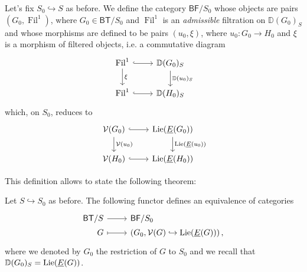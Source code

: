 \begin{defn}[]
	Let's fix $S_0 \hookrightarrow S$ as before.
	We define the category $\mathsf{BF}/S_0$ whose objects
	are pairs $(G_0, \operatorname{Fil}^1)$, where $G_0 \in \mathsf{BT}/S_0$
	and $\operatorname{Fil}^1$ is an \emph{admissible} filtration on
	$\mathbb{D}(G_0)_S$ and whose morphisms are defined to be
	pairs $(u_0, \xi)$, where $u_0\colon G_0 \to H_0$
	and $\xi$ is a morphism of filtered objects, i.e$.$ a commutative diagram
	\begin{equation*}
	\begin{tikzcd}
		\operatorname{Fil}^1 \arrow[d, "\xi", rightarrow] 
		\arrow[r, "", hookrightarrow] &
		\mathbb{D}(G_0)_S 
		\arrow[d, "\mathbb{D}(u_0)_S", rightarrow] \\
		\operatorname{Fil}^1 \arrow[r, "", hookrightarrow] &
		\mathbb{D}(H_0)_S
	\end{tikzcd}
	\end{equation*}
	which, on $S_0$, reduces to
	\begin{equation*}
	\begin{tikzcd}
		\mathcal{V}(G_0) \arrow[r, "", hookrightarrow] 
		\arrow[d, "\mathcal{V}(u_0)", rightarrow] &
		\lie(\underline{E}(G_0))
		\arrow[d, "\lie(\underline{E}(u_0))", rightarrow] \\
		\mathcal{V}(H_0) \arrow[r, "", hookrightarrow] &
		\lie(\underline{E}(H_0))
	\end{tikzcd}
	\end{equation*}
\end{defn}


\noindent
This definition allows to state the following theorem:
\begin{thm}\label{thm:EquivCatBTS}
	Let $S \hookrightarrow S_0$ as before.
	The following functor defines an equivalence of categories
	\begin{equation*}
	\begin{tikzcd}[row sep = 0ex
		,/tikz/column 1/.append style={anchor=base east}
		,/tikz/column 2/.append style={anchor=base west}]
		\mathsf{BT}/S \arrow[r, "", rightarrow] &
		\mathsf{BF}/S_0 \\
		G \arrow[r, "", mapsto] & 
		\left(G_0, \mathcal{V}(G) \hookrightarrow \lie(\underline{E}(G))\right)
	,\end{tikzcd}
	\end{equation*} 
	where we denoted by $G_0$ the restriction of $G$ to $S_0$
	and we recall that $\mathbb{D}(G_0)_S = \operatorname{Lie}(\underline{E}(G))$.
\end{thm}


